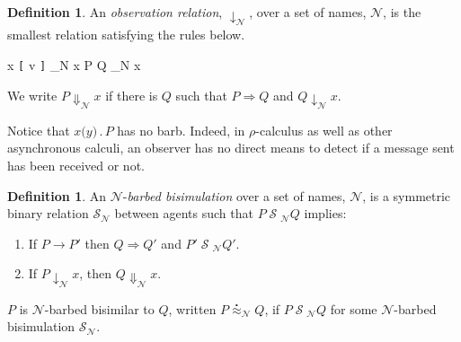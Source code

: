 \documentclass[]{amsart}
\newcommand{\lliftb}{\langle\!|}
\newcommand{\rliftb}{|\!\rangle}
\newcommand{\lpquote}{\ulcorner}
\newcommand{\rpquote}{\urcorner}
\newcommand{\id}[1]{\texttt{#1}}
\newcommand{\juxtap}{\mathbin{\id{|}}}
\newcommand{\concat}{\mathbin{.}}
\newcommand{\nameeq}{\mathbin{\equiv_N}}
\newcommand{\binpar}[2]{#1 \juxtap #2}
\newcommand{\outputp}[2]{#1 \id{[} #2 \id{]}}
\newcommand{\prefix}[3]{#1 \id{(} #2 \id{)} \concat #3}
\newcommand{\lift}[2]{#1 \lliftb #2 \rliftb}
\newcommand{\quotep}[1]{\lpquote #1 \rpquote}
\newcommand{\red}{\rightarrow}
\newcommand{\wred}{\Rightarrow}
\newcommand{\rel}[1]{\;{\mathcal #1}\;} %
\newcommand{\wbbisim}{\stackrel{\centerdot}{\approx}} %
\newcommand{\fwbeq}{\stackrel{\circ}{\approx}}	%
\theoremstyle{definition}
\newtheorem{defn}[thm]{Definition}
\theoremstyle{remark}
\newtheorem{rem}[thm]{Remark}
\numberwithin{equation}{subsection}
\newcommand{\pic}{$\pi$-calculus}
\newcommand{\rhoc}{$\rho$-calculus}
\begin{document}

\begin{defn}
An \emph{observation relation}, $\downarrow_{\mathcal N}$, over a set
of names, $\mathcal N$, is the smallest relation satisfying the rules
below.

\infrule[Out-barb]{y \in {\mathcal N}, \; x \nameeq y}
		  {\outputp{x}{v} \downarrow_{\mathcal N} x}
		  {\binpar{P}{Q} \downarrow_{\mathcal N} x}

We write $P \Downarrow_{\mathcal N} x$ if there is $Q$ such that 
$P \wred Q$ and $Q \downarrow_{\mathcal N} x$.
\end{defn}

Notice that $\prefix{x}{y}{P}$ has no barb.  Indeed, in {\rhoc} as well
as other asynchronous calculi, an observer has no direct means to
detect if a message sent has been received or not.

\begin{defn}
An  ${\mathcal N}$-\emph{barbed bisimulation} over a set of names, ${\mathcal N}$, is a symmetric binary relation 
${\mathcal S}_{\mathcal N}$ between agents such that $P\rel{S}_{\mathcal N}Q$ implies:
\begin{enumerate}
\item If $P \red P'$ then $Q \wred Q'$ and $P'\rel{S}_{\mathcal N} Q'$.
\item If $P\downarrow_{\mathcal N} x$, then $Q\Downarrow_{\mathcal N} x$.
\end{enumerate}
$P$ is ${\mathcal N}$-barbed bisimilar to $Q$, written
$P \wbbisim_{\mathcal N} Q$, if $P \rel{S}_{\mathcal N} Q$ for some ${\mathcal N}$-barbed bisimulation ${\mathcal S}_{\mathcal N}$.
\end{defn}


\end{document}
